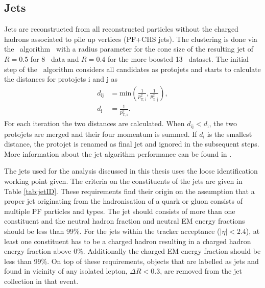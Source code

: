 \subsection{Jets}
\label{sec:JetID}
Jets are reconstructed  from all reconstructed particles without the charged hadrons associated to pile up vertices (PF+CHS jets). The clustering is done via the \antikt\ algorithm~\cite{Cacciari:2008gp} with a radius parameter for the cone size of the resulting jet of $R=0.5$ for 8 \TeV\ data and $R=0.4$ for the more boosted 13 \TeV\ dataset. The initial step of the \antikt\ algorithm considers all candidates as protojets and starts to calculate the distances for protojets i and j as
\begin{equation}
\begin{aligned}
   d_{\mathrm{ij}} &= \mathrm{min}\left(\frac{1}{p_{\mathrm{T,i}}^2}, \frac{1}{p_{\mathrm{T,j}}^2}\right), \\
   d_{\mathrm{i}} &= \frac{1}{p_{\mathrm{T,i}}^2}.
 \end{aligned}
\end{equation}
For each iteration the two distances are calculated. When $d_{\mathrm{ij}} < d_{\mathrm{i}}$, the two protojets are merged and their four momentum is summed. If $d_{\mathrm{i}}$ is the smallest distance, the protojet is renamed as final jet and ignored in the subsequent steps. More information about the jet algorithm performance can be found in \cite{CMS-PAS-JME-16-003}.

The jets used for the analysis discussed in this thesis uses the loose identification working point given. The criteria on the constituents of the jets are given in Table \ref{tab:jetID}. These requirements find their origin on the assumption that a proper jet originating from the hadronisation of a quark or gluon consists of multiple PF particles and types. The jet should consists of more than one constituent and the neutral hadron fraction and neutral EM energy fractions should be less than 99\%. For the jets within the tracker acceptance ($|\eta|<2.4$), at least one constituent has to be a charged hadron resulting in a charged hadron energy fraction above 0\%. Additionally the charged EM energy fraction should be less than 99\%. On top of these requirements, objects that are labelled as jets and found in vicinity of any isolated lepton, $\Delta R < 0.3$, are removed from the jet collection in that event. 


